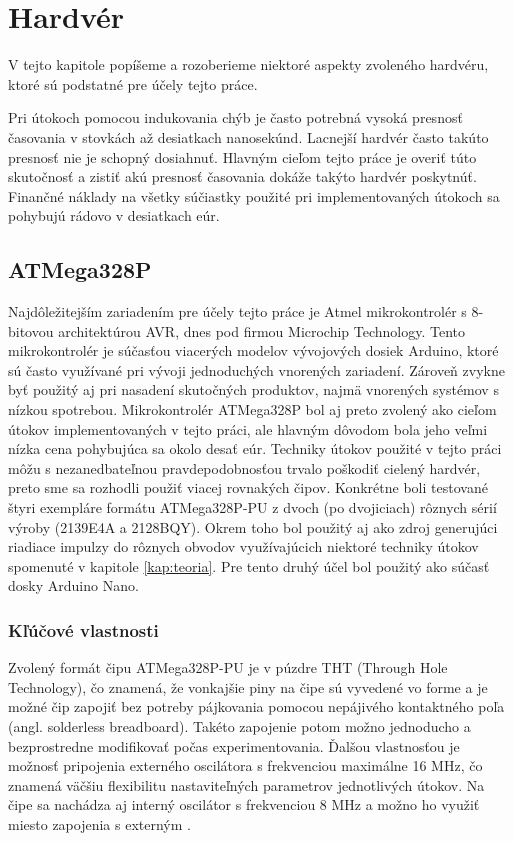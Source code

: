 \chapter{Hardvér}

\label{kap:hardver}

V tejto kapitole popíšeme a rozoberieme niektoré aspekty zvoleného hardvéru, ktoré sú podstatné pre účely tejto práce.

Pri útokoch pomocou indukovania chýb je často potrebná vysoká presnosť časovania v stovkách až desiatkach nanosekúnd. Lacnejší hardvér často takúto presnosť nie je schopný dosiahnuť. Hlavným cieľom tejto práce je overiť túto skutočnosť a zistiť akú presnosť časovania dokáže takýto hardvér poskytnúť. Finančné náklady na všetky súčiastky použité pri implementovaných útokoch sa pohybujú rádovo v desiatkach eúr.

\section{ATMega328P}
Najdôležitejším zariadením pre účely tejto práce je Atmel mikrokontrolér s 8-bitovou architektúrou AVR, dnes pod firmou Microchip Technology. Tento mikrokontrolér je súčasťou viacerých modelov vývojových dosiek Arduino, ktoré sú často využívané pri vývoji jednoduchých vnorených zariadení. Zároveň zvykne byť použitý aj pri nasadení skutočných produktov, najmä vnorených systémov s nízkou spotrebou. Mikrokontrolér ATMega328P bol aj preto zvolený ako cieľom útokov implementovaných v tejto práci, ale hlavným dôvodom bola jeho veľmi nízka cena pohybujúca sa okolo desať eúr. Techniky útokov použité v tejto práci môžu s nezanedbateľnou pravdepodobnosťou trvalo poškodiť cielený hardvér, preto sme sa rozhodli použiť viacej rovnakých čipov. Konkrétne boli testované štyri exempláre formátu ATMega328P-PU z dvoch (po dvojiciach) rôznych sérií výroby (2139E4A a 2128BQY). Okrem toho bol použitý aj ako zdroj generujúci riadiace impulzy do rôznych obvodov využívajúcich niektoré techniky útokov spomenuté v kapitole \ref{kap:teoria}. Pre tento druhý účel bol použitý ako súčasť dosky Arduino Nano.

\subsection{Kľúčové vlastnosti}
Zvolený formát čipu ATMega328P-PU je v púzdre THT (Through Hole Technology), čo znamená, že vonkajšie piny na čipe sú vyvedené vo forme  a je možné čip zapojiť bez potreby pájkovania pomocou nepájivého kontaktného poľa (angl. solderless breadboard). Takéto zapojenie potom možno jednoducho a bezprostredne modifikovať počas experimentovania. Ďalšou vlastnosťou je možnosť pripojenia externého oscilátora s frekvenciou maximálne 16 MHz, čo znamená väčšiu flexibilitu nastaviteľných parametrov jednotlivých útokov. Na čipe sa nachádza aj interný oscilátor s frekvenciou 8 MHz a možno ho využiť miesto zapojenia s externým \cite{atmegaData}.

